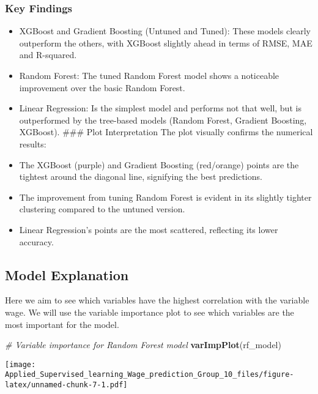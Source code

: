 \documentclass[
]{article}
\newenvironment{Shaded}{\begin{snugshade}}{\end{snugshade}}
\newcommand{\CommentTok}[1]{\textcolor[rgb]{0.56,0.35,0.01}{\textit{#1}}}
\newcommand{\FunctionTok}[1]{\textcolor[rgb]{0.13,0.29,0.53}{\textbf{#1}}}
\newcommand{\NormalTok}[1]{#1}
\begin{document}
\subsubsection{Key Findings}\label{key-findings}

\begin{itemize}
\item
  XGBoost and Gradient Boosting (Untuned and Tuned): These models
  clearly outperform the others, with XGBoost slightly ahead in terms of
  RMSE, MAE and R-squared.
\item
  Random Forest: The tuned Random Forest model shows a noticeable
  improvement over the basic Random Forest.
\item
  Linear Regression: Is the simplest model and performs not that well,
  but is outperformed by the tree-based models (Random Forest, Gradient
  Boosting, XGBoost). \#\#\# Plot Interpretation The plot visually
  confirms the numerical results:
\item
  The XGBoost (purple) and Gradient Boosting (red/orange) points are the
  tightest around the diagonal line, signifying the best predictions.
\item
  The improvement from tuning Random Forest is evident in its slightly
  tighter clustering compared to the untuned version.
\item
  Linear Regression's points are the most scattered, reflecting its
  lower accuracy.
\end{itemize}

\subsection{Model Explanation}\label{model-explanation}

Here we aim to see which variables have the highest correlation with the
variable wage. We will use the variable importance plot to see which
variables are the most important for the model.

\begin{Shaded}
\begin{Highlighting}[]
\CommentTok{\# Variable importance for Random Forest model}
\FunctionTok{varImpPlot}\NormalTok{(rf\_model)}
\end{Highlighting}
\end{Shaded}

\texttt{[image: Applied\_Supervised\_learning\_Wage\_prediction\_Group\_10\_files/figure-latex/unnamed-chunk-7-1.pdf]}
\end{document}
